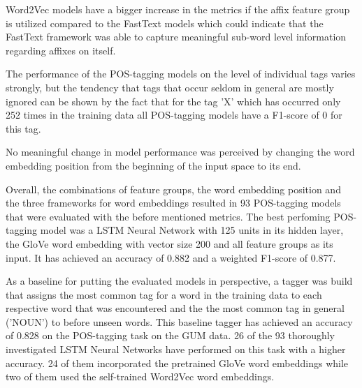 Word2Vec models have a bigger increase in the metrics if the affix feature group is utilized compared to the FastText models which could indicate that the FastText framework was able to capture meaningful sub-word level information regarding affixes on itself.

The performance of the POS-tagging models on the level of individual tags varies strongly, but the tendency that tags that occur seldom in general are mostly ignored can be shown by the fact that for the tag 'X' which has occurred only 252 times in the training data all POS-tagging models have a F1-score of 0 for this tag.

No meaningful change in model performance was perceived by changing the word embedding position from the beginning of the input space to its end.

Overall, the combinations of feature groups, the word embedding position and the three frameworks for word embeddings resulted in 93 POS-tagging models that were evaluated with the before mentioned metrics. The best perfoming POS-tagging model was a LSTM Neural Network with 125 units in its hidden layer, the GloVe word embedding with vector size 200 and all feature groups as its input. It has achieved an accuracy of 0.882 and a weighted F1-score of 0.877.

As a baseline for putting the evaluated models in perspective, a tagger was build that assigns the most common tag for a word in the training data to each respective word that was encountered and the the most common tag in general ('NOUN') to before unseen words. This baseline tagger has achieved an accuracy of 0.828 on the POS-tagging task on the GUM data. 26 of the 93 thoroughly investigated LSTM Neural Networks have performed on this task with a higher accuracy. 24 of them incorporated the pretrained GloVe word embeddings while two of them used the self-trained Word2Vec word embeddings.
